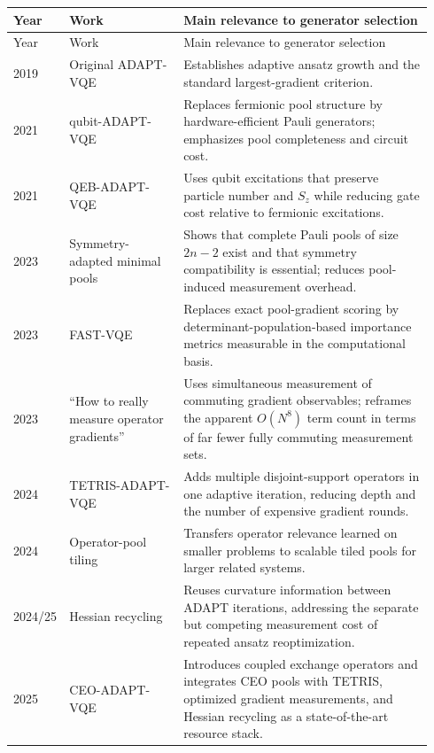 \documentclass[11pt]{article}
\begin{document}
\begin{longtable}{p{0.08\linewidth}p{0.27\linewidth}p{0.59\linewidth}}
\toprule
Year & Work & Main relevance to generator selection \\
\midrule
\endfirsthead
\toprule
Year & Work & Main relevance to generator selection \\
\midrule
\endhead
2019 & Original ADAPT-VQE \cite{Grimsley2019} & Establishes adaptive ansatz growth and the standard largest-gradient criterion. \\
2021 & qubit-ADAPT-VQE \cite{Tang2021} & Replaces fermionic pool structure by hardware-efficient Pauli generators; emphasizes pool completeness and circuit cost. \\
2021 & QEB-ADAPT-VQE \cite{Yordanov2021} & Uses qubit excitations that preserve particle number and $S_z$ while reducing gate cost relative to fermionic excitations. \\
2023 & Symmetry-adapted minimal pools \cite{Shkolnikov2023} & Shows that complete Pauli pools of size $2n-2$ exist and that symmetry compatibility is essential; reduces pool-induced measurement overhead. \\
2023 & FAST-VQE \cite{Majland2023} & Replaces exact pool-gradient scoring by determinant-population-based importance metrics measurable in the computational basis. \\
2023 & ``How to really measure operator gradients'' \cite{Anastasiou2023} & Uses simultaneous measurement of commuting gradient observables; reframes the apparent $O(N^8)$ term count in terms of far fewer fully commuting measurement sets. \\
2024 & TETRIS-ADAPT-VQE \cite{Anastasiou2024TETRIS} & Adds multiple disjoint-support operators in one adaptive iteration, reducing depth and the number of expensive gradient rounds. \\
2024 & Operator-pool tiling \cite{VanDyke2024} & Transfers operator relevance learned on smaller problems to scalable tiled pools for larger related systems. \\
2024/25 & Hessian recycling \cite{Ramoa2025Hessian} & Reuses curvature information between ADAPT iterations, addressing the separate but competing measurement cost of repeated ansatz reoptimization. \\
2025 & CEO-ADAPT-VQE \cite{Ramoa2025CEO} & Introduces coupled exchange operators and integrates CEO pools with TETRIS, optimized gradient measurements, and Hessian recycling as a state-of-the-art resource stack. \\

\end{longtable}
\end{document}
